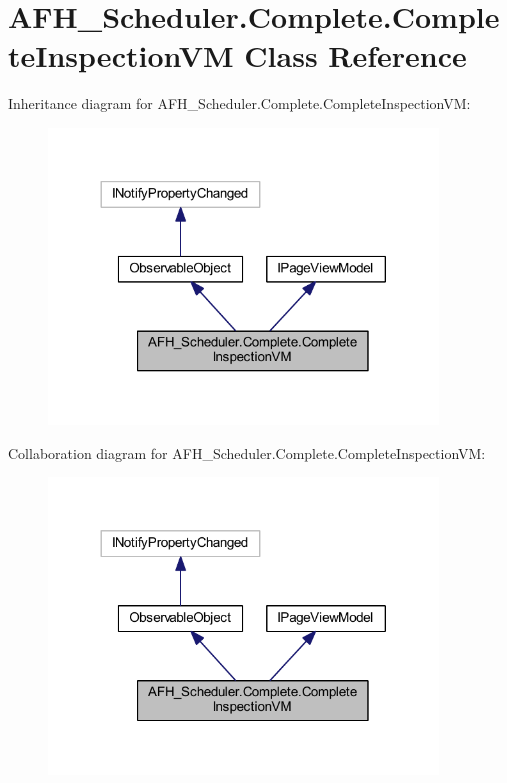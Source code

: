 \section{A\+F\+H\+\_\+\+Scheduler.\+Complete.\+Complete\+Inspection\+VM Class Reference}
\label{class_a_f_h___scheduler_1_1_complete_1_1_complete_inspection_v_m}


Inheritance diagram for A\+F\+H\+\_\+\+Scheduler.\+Complete.\+Complete\+Inspection\+VM\+:
\nopagebreak
\begin{figure}[H]
\begin{center}
\leavevmode
\includegraphics[width=293pt]{class_a_f_h___scheduler_1_1_complete_1_1_complete_inspection_v_m__inherit__graph}
\end{center}
\end{figure}


Collaboration diagram for A\+F\+H\+\_\+\+Scheduler.\+Complete.\+Complete\+Inspection\+VM\+:
\nopagebreak
\begin{figure}[H]
\begin{center}
\leavevmode
\includegraphics[width=293pt]{class_a_f_h___scheduler_1_1_complete_1_1_complete_inspection_v_m__coll__graph}
\end{center}
\end{figure}
